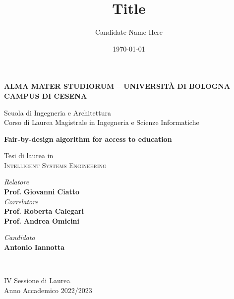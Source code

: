 \title{Title}
\author{Candidate Name Here}
\date{\today}

\begin{titlepage}
	\begin{center}
		
		\large
		\textbf{ALMA MATER STUDIORUM -- UNIVERSITÀ DI BOLOGNA \\ CAMPUS DI CESENA}
		\\
		\noindent\hrulefill
		\vspace{0.4cm}
		
		\Large
		Scuola di Ingegneria e Architettura \\
		Corso di Laurea Magistrale in Ingegneria e Scienze Informatiche
		
		\Huge
		\vspace{4cm}
		\textbf{
			Fair-by-design algorithm for access to education
		}
		
		\large
		\vspace{1cm}
		Tesi di laurea in 
		\\
		\textsc{Intelligent Systems Engineering}
		
		\vspace{5.5cm}
		\begin{minipage}[t]{0.64\textwidth}
			\begin{flushleft}
				\textit{Relatore} 
				\\ 
				\textbf{Prof.} \textbf{Giovanni Ciatto}
				\\
				\vspace{0.4cm}
				\textit{Correlatore} 
				\\
				\textbf{Prof.} \textbf{Roberta Calegari}
				\\
				\textbf{Prof.} \textbf{Andrea Omicini}
			\end{flushleft}
		\end{minipage}
		\begin{minipage}[t]{0.34\textwidth}
			\begin{flushright}
				\textit{Candidato} 
				\\ 
				\textbf{Antonio Iannotta}
			\end{flushright}
		\end{minipage}\\
		
		\vfill
		\noindent\hrulefill
		\vspace{0.3cm}
		\Large
		
		IV Sessione di Laurea
		\\
		Anno Accademico 2022/2023
	\end{center}
\end{titlepage}
\restoregeometry
